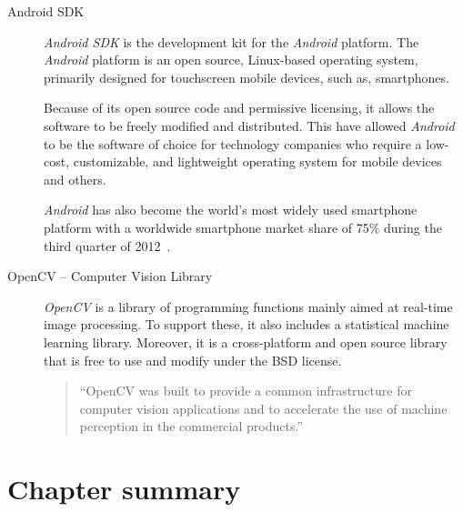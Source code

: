 \begin{description}

\item[Android SDK] \hfill \label{sec:sota:tech:android}

\emph{Android SDK} is the development kit for the \emph{Android}
platform. The \emph{Android} platform is an open source, Linux-based
operating system, primarily designed for touchscreen mobile devices,
such as, smartphones.

Because of its open source code and permissive licensing, it allows
the software to be freely modified and distributed. This have allowed
\emph{Android} to be the software of choice for technology companies
who require a low-cost, customizable, and lightweight operating system
for mobile devices and others.

\emph{Android} has also become the world's most widely used smartphone
platform with a worldwide smartphone market share of 75\%
during the third quarter of 2012~\cite{Idc2013Android}.

\item[OpenCV -- Computer Vision Library] \hfill \label{sec:sota:tech:opencv}

\emph{OpenCV} is a library of programming functions mainly aimed at
real-time image processing. To support these, it also includes a
statistical machine learning library. Moreover, it is a cross-platform
and open source library that is free to use and modify under the BSD
license.

\begin{quote}
  ``OpenCV was built to provide a common infrastructure for computer
  vision applications and to accelerate the use of machine perception
  in the commercial products.''~\cite{Opencv2013About}
\end{quote}

\end{description}

\section{Chapter summary}

